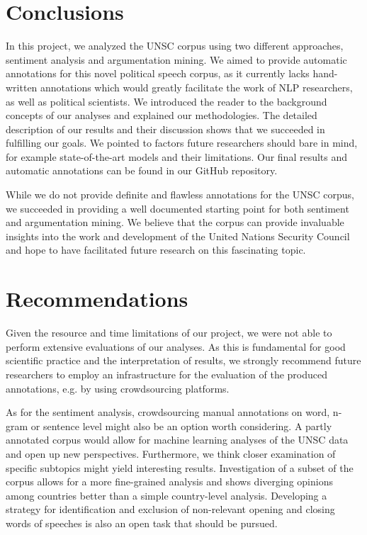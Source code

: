 \section{Conclusions}
\label{conclu}

In this project, we analyzed the UNSC corpus using two different approaches, sentiment analysis and argumentation mining. We aimed to provide automatic annotations for this novel political speech corpus, as it currently lacks hand-written annotations which would greatly facilitate the work of NLP researchers, as well as political scientists. We introduced the reader to the background concepts of our analyses and explained our methodologies. The detailed description of our results and their discussion shows that we succeeded in fulfilling our goals. We pointed to factors future researchers should bare in mind, for example state-of-the-art models and their limitations. Our final results and automatic annotations can be found in our GitHub repository\footnotemark[2].

While we do not provide definite and flawless annotations for the UNSC corpus, we succeeded in providing a well documented starting point for both sentiment and argumentation mining. We believe that the corpus can provide invaluable insights into the work and development of the United Nations Security Council and hope to have facilitated future research on this fascinating topic.

\section{Recommendations}
\label{reco}

 Given the resource and time limitations of our project, we were not able to perform extensive evaluations of our analyses. As this is fundamental for good scientific practice and the interpretation of results, we strongly recommend future researchers to employ an infrastructure for the evaluation of the produced annotations, e.g. by using crowdsourcing platforms. 
 
 As for the sentiment analysis, crowdsourcing manual annotations on word, n-gram or sentence level might also be an option worth considering. A partly annotated corpus would allow for machine learning analyses of the UNSC data and open up new perspectives. Furthermore, we think closer examination of specific subtopics might yield interesting results. Investigation of a subset of the corpus allows for a more fine-grained analysis and shows diverging opinions among countries better than a simple country-level analysis. Developing a strategy for identification and exclusion of non-relevant opening and closing words of speeches is also an open task that should be pursued.
 
